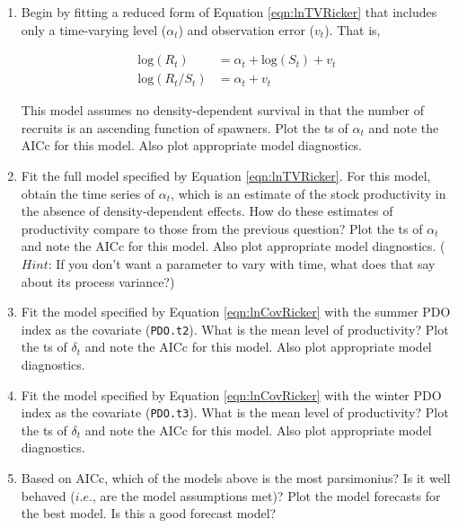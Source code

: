 \documentclass[10pt]{article}
\begin{document}
\begin{enumerate} \itemsep5pt \parskip0pt 

\item Begin by fitting a reduced form of Equation \ref{eqn:lnTVRicker} that includes only a time-varying level ($\alpha_t$) and observation error ($v_t$).  That is,

\begin{equation}
\begin{aligned}
\text{log}(R_t) &= \alpha_t + \text{log}(S_t) + v_t \\
\text{log}(R_t/S_t) &= \alpha_t + v_t
\end{aligned}
\end{equation}

This model assumes no density-dependent survival in that the number of recruits is an ascending function of spawners.  Plot the ts of $\alpha_t$ and note the AICc for this model.  Also plot appropriate model diagnostics.

\item Fit the full model specified by Equation \ref{eqn:lnTVRicker}.  For this model, obtain the time series of $\alpha_t$, which is an estimate of the stock productivity in the absence of density-dependent effects. How do these estimates of productivity compare to those from the previous question?  Plot the ts of $\alpha_t$ and note the AICc for this model.  Also plot appropriate model diagnostics.  ($Hint$: If you don't want a parameter to vary with time, what does that say about its process variance?)

\item Fit the model specified by Equation \ref{eqn:lnCovRicker} with the summer PDO index as the covariate (\texttt{PDO.t2}). What is the mean level of productivity?  Plot the ts of $\delta_t$ and note the AICc for this model.  Also plot appropriate model diagnostics.

\item Fit the model specified by Equation \ref{eqn:lnCovRicker} with the winter PDO index as the covariate (\texttt{PDO.t3}). What is the mean level of productivity?  Plot the ts of $\delta_t$ and note the AICc for this model.  Also plot appropriate model diagnostics.

\item Based on AICc, which of the models above is the most parsimonius?  Is it well behaved ($i.e.$, are the model assumptions met)?  Plot the model forecasts for the best model.  Is this a good forecast model?  

\end{enumerate}


\end{document}
